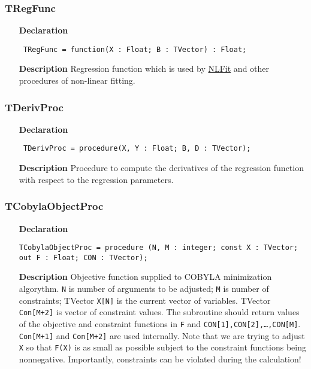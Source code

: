 \documentclass[12pt,a4paper,oneside]{report}
\newcommand{\lmatha}[1]{   %
	\marginpar{\vspace{#1} 
		\begin{flushright}
			LMath 0.5
	\end{flushright} }
}
\newcommand{\declarationitem}[1]{\textbf{#1}}
\newcommand{\descriptiontitle}[1]{\textbf{#1}}
\newcommand{\code}[1]{\texttt{#1}}
\begin{document}
\subsubsection{TRegFunc}
\label{utypes-TRegFunc}
\begin{itemize}\item[\declarationitem{Declaration}\hfill]
	\begin{flushleft}
		\code{
			TRegFunc = function(X : Float; B : TVector) : Float;}
	\end{flushleft}
	\item[\descriptiontitle{Description}]
	Regression function which is used by \hyperref[unlfit-NLFit]{NLFit} and other procedures of non-linear fitting.
\end{itemize}
\subsubsection{TDerivProc}
\label{utypes-TDerivProc}
\begin{itemize}\item[\declarationitem{Declaration}\hfill]
	\begin{flushleft}
		\code{
			TDerivProc = procedure(X, Y : Float; B, D : TVector);}
	\end{flushleft}
	\par
	\item[\descriptiontitle{Description}]
	Procedure to compute the derivatives of the regression function with respect to the regression parameters.
\end{itemize}
\subsubsection{TCobylaObjectProc}\lmatha{-28pt}
\label{utypes_TCobylaObjectProc}
\begin{itemize}
	\item[\declarationitem{Declaration}\hfill]
	\begin{flushleft}
	\code{TCobylaObjectProc = procedure (N, M : integer; const X : TVector; out F : Float; CON : TVector);}
	\end{flushleft}
	\item[\descriptiontitle{Description}]
	Objective function supplied to COBYLA minimization algorythm.
	\code{N} is number of arguments to be adjusted;
	\code{M} is number of constraints;
	TVector \code{X[N]} is the current vector of variables.
	TVector \code{Con[M+2]} is vector of constraint values. The subroutine should return values of the objective and constraint functions in \code{F} and \code{CON[1],CON[2],\dots,CON[M]}. \code{Con[M+1]} and \code{Con[M+2]} are used internally. Note that we are trying to adjust \code{X} so that \code{F(X)} is as small as possible subject to the constraint functions
	being nonnegative. Importantly, constraints can be violated during the calculation!
\end{itemize}
\end{document}
